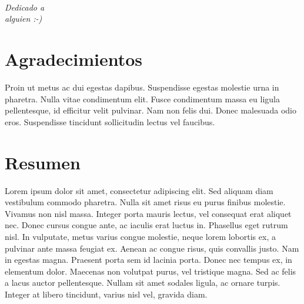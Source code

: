 
\newpage
$\ $
\thispagestyle{empty}


\chapter*{}
\setcounter{page}{3}

\begin{flushright}
\textit{Dedicado a \\
alguien :-)}
\end{flushright}



\chapter*{Agradecimientos} %

Proin ut metus ac dui egestas dapibus. Suspendisse egestas molestie urna in pharetra. Nulla vitae condimentum elit. Fusce condimentum massa eu ligula pellentesque, id efficitur velit pulvinar. Nam non felis dui. Donec malesuada odio eros. Suspendisse tincidunt sollicitudin lectus vel faucibus.


\chapter*{Resumen} %

Lorem ipsum dolor sit amet, consectetur adipiscing elit. Sed aliquam diam vestibulum commodo pharetra. Nulla sit amet risus eu purus finibus molestie. Vivamus non nisl massa. Integer porta mauris lectus, vel consequat erat aliquet nec. Donec cursus congue ante, ac iaculis erat luctus in. Phasellus eget rutrum nisl. In vulputate, metus varius congue molestie, neque lorem lobortis ex, a pulvinar ante massa feugiat ex. Aenean ac congue risus, quis convallis justo. Nam in egestas magna. Praesent porta sem id lacinia porta. Donec nec tempus ex, in elementum dolor. Maecenas non volutpat purus, vel tristique magna. Sed ac felis a lacus auctor pellentesque. Nullam sit amet sodales ligula, ac ornare turpis. Integer at libero tincidunt, varius nisl vel, gravida diam.


